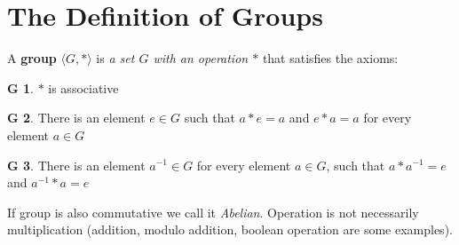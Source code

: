 \documentclass[a4paper,12pt]{article}
\theoremstyle{definition}
\theoremstyle{axiom}
\newtheorem{axiom}{G}[]
\theoremstyle{theorem}
\begin{document}
\section{The Definition of Groups}
A \textbf{group} $\langle G, * \rangle$ is \textit{a set $G$ with an operation $*$} that satisfies the axioms:
\begin{axiom}
$*$ is associative
\end{axiom}
\begin{axiom}
There is an element $e \in G$ such that $a * e = a$ and $e * a = a$ for every element $a \in G$ 
\end{axiom}
\begin{axiom}
There is an element $a^{-1} \in G$ for every element $a \in G$, such that $a * a^{-1} = e$ and $a^{-1} * a = e$ 
\end{axiom}
If group is also commutative we call it \textit{Abelian}. Operation is not necessarily multiplication (addition, modulo addition, boolean operation are some examples).
\end{document}

